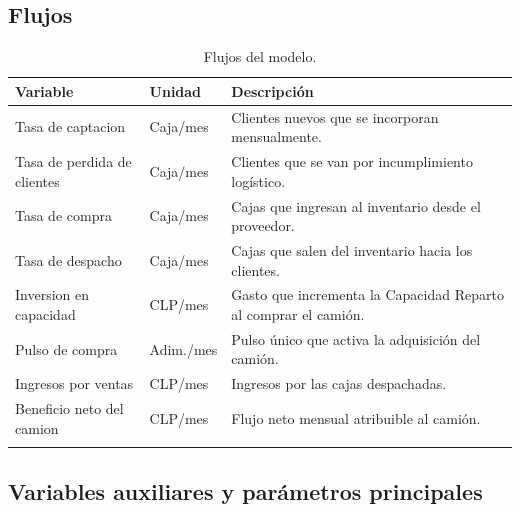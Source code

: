 \documentclass[10pt,a4paper]{article}
\begin{document}
\subsection{Flujos}

\begin{longtable}{>{\ttfamily}p{4.5cm} p{2.5cm} p{7cm}}
\toprule
Variable & Unidad & Descripción \\
\midrule
\endhead
Tasa de captacion & Caja/mes & Clientes nuevos que se incorporan mensualmente. \\[4pt]
Tasa de perdida de clientes & Caja/mes & Clientes que se van por incumplimiento logístico. \\[4pt]
Tasa de compra & Caja/mes & Cajas que ingresan al inventario desde el proveedor. \\[4pt]
Tasa de despacho & Caja/mes & Cajas que salen del inventario hacia los clientes. \\[4pt]
Inversion en capacidad & CLP/mes & Gasto que incrementa la Capacidad Reparto al comprar el camión. \\[4pt]
Pulso de compra & Adim./mes & Pulso único que activa la adquisición del camión. \\[4pt]
Ingresos por ventas & CLP/mes & Ingresos por las cajas despachadas. \\[4pt]
Beneficio neto del camion & CLP/mes & Flujo neto mensual atribuible al camión. \\
\bottomrule
\caption{Flujos del modelo.}
\end{longtable}

\subsection{Variables auxiliares y parámetros principales}
\end{document}
